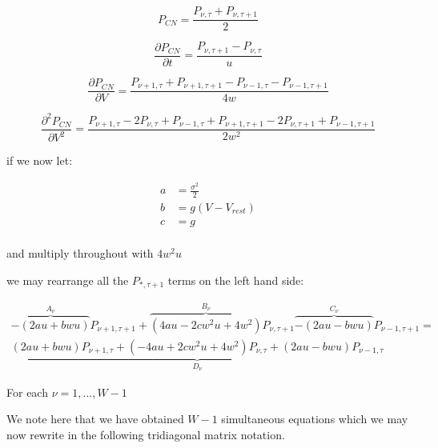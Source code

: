 \documentclass[10pt]{article}
\begin{document}

\begin{equation}
    P_{CN} = \frac{P_{\nu,\tau} + P_{\nu,\tau + 1}}{2}
\end{equation}

\begin{equation}
    \frac{\partial P_{CN}}{\partial t} = \frac{P_{\nu,\tau +1 } -
    P_{\nu,\tau}}{u}
\end{equation}

\begin{equation}
    \frac{\partial P_{CN}}{\partial V} = 
    \frac{P_{\nu +1,\tau } + P_{\nu +1,\tau +1 } -
    P_{\nu - 1,\tau } - P_{\nu -1,\tau +1}} 
    {4w}
\end{equation}

\begin{equation}
    \frac{\partial^2 P_{CN}}{\partial V^2} = 
    \frac{P_{\nu+1,\tau} - 2 P_{\nu,\tau} + P_{\nu-1,\tau} +
    P_{\nu+1,\tau+1} - 2 P_{\nu,\tau+1} + P_{\nu-1,\tau+1}}
    {2w^2}
\end{equation}

if we now let:

\begin{align*}
a &= \frac{\sigma^2}{2} \\
b &= g(V - V_{rest}) \\
c &= g \\
\end{align*}

and multiply throughout with $4w^2u$

we may rearrange all the $P_{*,\tau+1} $ terms on the left hand side:

\begin{multline}
    \overbrace{-(2au+bwu)}^{A_\nu} P_{\nu+1,\tau+1} + 
    \overbrace{(4au - 2cw^2u + 4w^2)}^{B_\nu} P_{\nu,\tau+1}
    \overbrace{-(2au-bwu)}^{C_\nu} P_{\nu-1,\tau+1}
    =  \\
    \underbrace{(2au+bwu) P_{\nu+1,\tau} +  
    (-4au +2cw^2u + 4w^2) P_{\nu,\tau} + 
    (2au-bwu) P_{\nu-1,\tau}}_{D_{\nu}}
\end{multline}

For each $ \nu = 1 , \dots , W-1 $

We note here that we have obtained $W-1$ simultaneous equations which
we may now rewrite in the following tridiagonal matrix notation.
\end{document}
